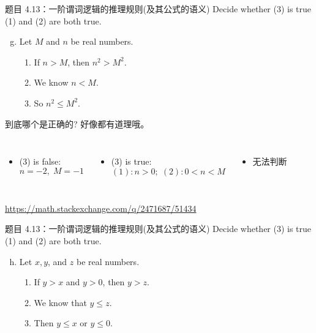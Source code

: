 \begin{frame}{}
  \begin{exampleblock}{题目 4.13：一阶谓词逻辑的推理规则(及其公式的语义)}
    Decide whether (3) is true  (1) and (2) are both true.

    \begin{enumerate}[(a)]
      \setcounter{enumi}{6}
      \item Let $M$ and $n$ be real numbers.
	\begin{enumerate}[(1)]
	  \item If $n > M$, then $n^2 > M^2$.
	  \item We know $n < M$.
	  \item So $n^2 \le M^2$.
	\end{enumerate}
    \end{enumerate}
  \end{exampleblock}

  \vspace{0.30cm}
  到底哪个是正确的? 好像都有道理哦。
  \begin{columns}[t]
      \begin{itemize}
	\item (3) is false: 
	  \[
	    n = -2, \; M = -1
	  \]
      \end{itemize}
      \begin{itemize}
        \item (3) is true:
	\[
	  (1): n > 0;\; (2): 0 < n < M
	\]
      \end{itemize}
      \begin{itemize}
        \item 无法判断
      \end{itemize}
  \end{columns}

  \vspace{0.60cm}
  \pause
  \centerline{\url{https://math.stackexchange.com/q/2471687/51434}}
\end{frame}

\begin{frame}{}
  \begin{exampleblock}{题目 4.13：一阶谓词逻辑的推理规则(及其公式的语义)}
    Decide whether (3) is true  (1) and (2) are both true.

    \begin{enumerate}[(a)]
      \setcounter{enumi}{7}
      \item Let $x,y$, and $z$ be real numbers.
	\begin{enumerate}[(1)]
	  \item If $y > x$ and $y > 0$, then $y > z$.
	  \item We know that $y \le z$.
	  \item Then $y \le x$ or $y \le 0$.
	\end{enumerate}
    \end{enumerate}
  \end{exampleblock}
\end{frame}

\begin{frame}[noframenumbering]{}
\end{frame}
